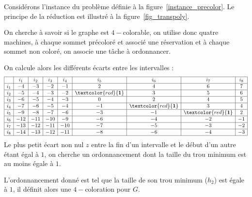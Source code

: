 \documentclass[a4paper,9pt]{report}
\begin{document}
\begin{ex}
    Considérons l'instance du problème \precolor définie à la figure~\ref{instance_precolor}.
    Le principe de la réduction est illustré à la figure~\ref{fig_transpoly}.

    On cherche à savoir si le graphe est $4-$colorable, on utilise donc quatre machines, à chaque
    sommet précoloré et associé une réservation et à chaque sommet non coloré, on associe une tâche
    à ordonnancer. 
    
    On calcule alors les différents écarts entre les intervalles : \[
        \begin{array}{|c|c|c|c|c|c|c|c|c|}
            \hline & i_1 & i_2 & i_3 & i_4 & i_5 & i_6 & i_7 & i_8 \\
            \hline i_1 & -4 & -3 & -2 & -1 & 2 & 4 & 6 & 7 \\
            \hline i_2 & -5 & -4 & -3 & -2 & \textcolor{red}{\textbf{1}} & 3 & 5 & 6 \\
            \hline i_3 & -6 & -5 & -4 & -3 & 0 & 2 & 4 & 5 \\
            \hline i_4 & -7 & -6 & -5 & -4 & -1 & \textcolor{red}{\textbf{1}} & 3 & 4 \\
            \hline i_5 & -9 & -8 & -7 & -6 & -3 & -1 & \textcolor{red}{\textbf{1}} & 2 \\
            \hline i_6 & -12 & -11 & -10 & -9 & -6 & -4 & -2 & -1 \\
            \hline i_7 & -13 & -12 & -11 & -10 & -7 & -5 & -3 & -2 \\
            \hline i_8 & -14 & -13 & -12 & -11 & -8 & -6 & -4 & -3 \\
            \hline
        \end{array}
    \]
    Le plus petit écart non nul $z$ entre la fin d'un intervalle et le début d'un
    autre étant égal à $1$, on cherche un ordonnancement dont la taille du trou minimum est au moins
    égale à $1$.

    L'ordonnancement donné est tel que la taille de son trou minimum ($h_2$) est égale à $1$, il
    définit alors une $4-$coloration pour $G$.
    
\begin{figure}
    \begin{center}
\end{center}
\end{figure}
\end{ex}
\end{document}
